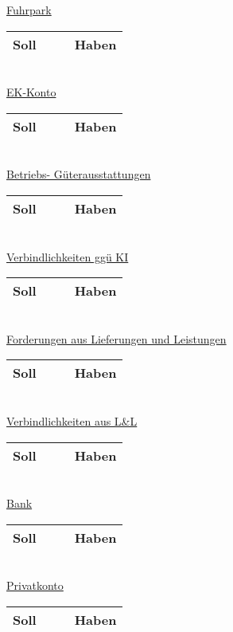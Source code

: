 \documentclass[paper=a4, fontsize=11pt]{scrartcl}
\numberwithin{equation}{section}
\numberwithin{figure}{section}
\numberwithin{table}{section}
\begin{document}
\underline{Fuhrpark}

\begin{tabular}{cc|cc}
\hline
Soll & & & Haben \\
\hline
\end{tabular}
\\

\underline{EK-Konto}

\begin{tabular}{cc|cc}
\hline
Soll & & & Haben \\
\hline
\end{tabular}
\\

\underline{Betriebs- Güterausstattungen}

\begin{tabular}{cc|cc}
\hline
Soll & & & Haben \\
\hline
\end{tabular}
\\

\underline{Verbindlichkeiten ggü KI}

\begin{tabular}{cc|cc}
\hline
Soll & & & Haben \\
\hline
\end{tabular}
\\

\underline{Forderungen aus Lieferungen und Leistungen}

\begin{tabular}{cc|cc}
\hline
Soll & & & Haben \\
\hline
\end{tabular}
\\

\underline{Verbindlichkeiten aus L&L}

\begin{tabular}{cc|cc}
\hline
Soll & & & Haben \\
\hline
\end{tabular}
\\

\underline{Bank}

\begin{tabular}{cc|cc}
\hline
Soll & & & Haben \\
\hline
\end{tabular}
\\

\underline{Privatkonto}

\begin{tabular}{cc|cc}
\hline
Soll & & & Haben \\
\hline
\end{tabular}
\\
\end{document}
